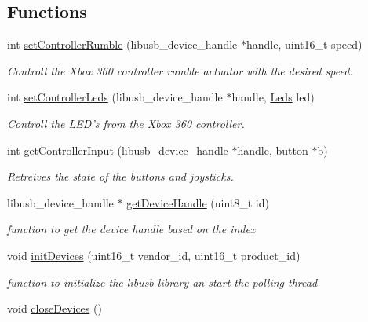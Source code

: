 \subsection*{Functions}
\begin{DoxyCompactItemize}
\item 
int \hyperlink{group__xbcdeamon_gae7cb117322f01a153aa80f498dd1a139}{set\-Controller\-Rumble} (libusb\-\_\-device\-\_\-handle $\ast$handle, uint16\-\_\-t speed)
\begin{DoxyCompactList}\small\item\em Controll the Xbox 360 controller rumble actuator with the desired speed. \end{DoxyCompactList}\item 
int \hyperlink{group__xbcdeamon_gacc1e0a36aea4db307a6700c13a74b4fb}{set\-Controller\-Leds} (libusb\-\_\-device\-\_\-handle $\ast$handle, \hyperlink{group__xbcdeamon_ga1e4b1d1d1b6272a280f18efef4db3f5e}{Leds} led)
\begin{DoxyCompactList}\small\item\em Controll the L\-E\-D's from the Xbox 360 controller. \end{DoxyCompactList}\item 
int \hyperlink{group__xbcdeamon_ga95c596cd7351f74efdcc094fb7e5def9}{get\-Controller\-Input} (libusb\-\_\-device\-\_\-handle $\ast$handle, \hyperlink{structbutton}{button} $\ast$b)
\begin{DoxyCompactList}\small\item\em Retreives the state of the buttons and joysticks. \end{DoxyCompactList}\item 
libusb\-\_\-device\-\_\-handle $\ast$ \hyperlink{group__xbcdeamon_gaafd41f70aa2d9dcc024b5cfb13c51276}{get\-Device\-Handle} (uint8\-\_\-t id)
\begin{DoxyCompactList}\small\item\em function to get the device handle based on the index \end{DoxyCompactList}\item 
void \hyperlink{group__xbcdeamon_gad84b9ecb621527e815351576cad72439}{init\-Devices} (uint16\-\_\-t vendor\-\_\-id, uint16\-\_\-t product\-\_\-id)
\begin{DoxyCompactList}\small\item\em function to initialize the libusb library an start the polling thread \end{DoxyCompactList}\item 
\hypertarget{group__xbcdeamon_ga2fe23e62171552ba2c4bc5704159a906}{void \hyperlink{group__xbcdeamon_ga2fe23e62171552ba2c4bc5704159a906}{close\-Devices} ()}\label{group__xbcdeamon_ga2fe23e62171552ba2c4bc5704159a906}


\end{DoxyCompactItemize}
